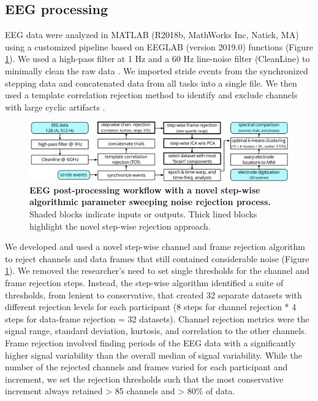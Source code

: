 \documentclass[../thesis_seyed.tex]{subfiles}
\begin{document}
\subsection{EEG processing}
EEG data were analyzed in MATLAB (R2018b, MathWorks Inc, Natick, MA) using a customized pipeline based on EEGLAB (version 2019.0) functions \cite{Delorme2004-yy} (Figure \ref{fig:fig3}). We used a high-pass filter at 1 Hz and a 60 Hz line-noise filter (CleanLine) to minimally clean the raw data \cite{Mullen2012-rh,Winkler2015-br}. We imported stride events from the synchronized stepping data and concatenated data from all tasks into a single file. We then used a template correlation rejection method to identify and exclude channels with large cyclic artifacts \cite{Oliveira2017-pk}.

\begin{figure}[!ht]
\centerline{\includegraphics{../img/03_EEG workflow.jpg}}
\caption{\textbf{EEG post-processing workflow with a novel step-wise algorithmic parameter sweeping noise rejection process.} Shaded blocks indicate inputs or outputs. Thick lined blocks highlight the novel step-wise rejection approach.}
\label{fig:fig3}
\end{figure}

We developed and used a novel step-wise channel and frame rejection algorithm to reject channels and data frames that still contained considerable noise (Figure \ref{fig:fig3}). We removed the researcher's need to set single thresholds for the channel and frame rejection steps. Instead, the step-wise algorithm identified a suite of thresholds, from lenient to conservative, that created 32 separate datasets with different rejection levels for each participant (8 steps for channel rejection * 4 steps for data-frame rejection = 32 datasets). Channel rejection metrics were the signal range, standard deviation, kurtosis, and correlation to the other channels. Frame rejection involved finding periods of the EEG data with a significantly higher signal variability than the overall median of signal variability. While the number of the rejected channels and frames varied for each participant and increment, we set the rejection thresholds such that the most conservative increment always retained > 85 channels and > 80\% of data.
\end{document}
